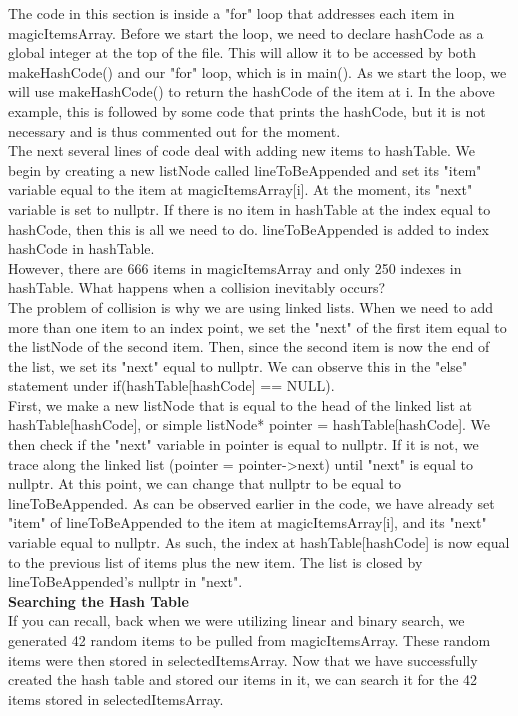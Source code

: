\documentclass{article}
\begin{document}
The code in this section is inside a "for" loop that addresses each item in magicItemsArray. Before we start the loop, we need to declare hashCode as a global integer at the top of the file. This will allow it to be accessed by both makeHashCode() and our "for" loop, which is in main(). As we start the loop, we will use makeHashCode() to return the hashCode of the item at i. In the above example, this is followed by some code that prints the hashCode, but it is not necessary and is thus commented out for the moment. \\
The next several lines of code deal with adding new items to hashTable. We begin by creating a new listNode called lineToBeAppended and set its "item" variable equal to the item at magicItemsArray[i]. At the moment, its "next" variable is set to nullptr. If there is no item in hashTable at the index equal to hashCode, then this is all we need to do. lineToBeAppended is added to index hashCode in hashTable. \\
However, there are 666 items in magicItemsArray and only 250 indexes in hashTable. What happens when a collision inevitably occurs? \\
The problem of collision is why we are using linked lists. When we need to add more than one item to an index point, we set the "next" of the first item equal to the listNode of the second item. Then, since the second item is now the end of the list, we set its "next" equal to nullptr. We can observe this in the "else" statement under if(hashTable[hashCode] == NULL). \\ 
First, we make a new listNode that is equal to the head of the linked list at hashTable[hashCode], or simple listNode* pointer = hashTable[hashCode]. We then check if the "next" variable in pointer is equal to nullptr. If it is not, we trace along the linked list (pointer = pointer->next) until "next" is equal to nullptr. At this point, we can change that nullptr to be equal to lineToBeAppended. As can be observed earlier in the code, we have already set "item" of lineToBeAppended to the item at magicItemsArray[i], and its "next" variable equal to nullptr. As such, the index at hashTable[hashCode] is now equal to the previous list of items plus the new item. The list is closed by lineToBeAppended's nullptr in "next". \\


\textbf{Searching the Hash Table} \\
If you can recall, back when we were utilizing linear and binary search, we generated 42 random items to be pulled from magicItemsArray. These random items were then stored in selectedItemsArray. Now that we have successfully created the hash table and stored our items in it, we can search it for the 42 items stored in selectedItemsArray.
\end{document}
